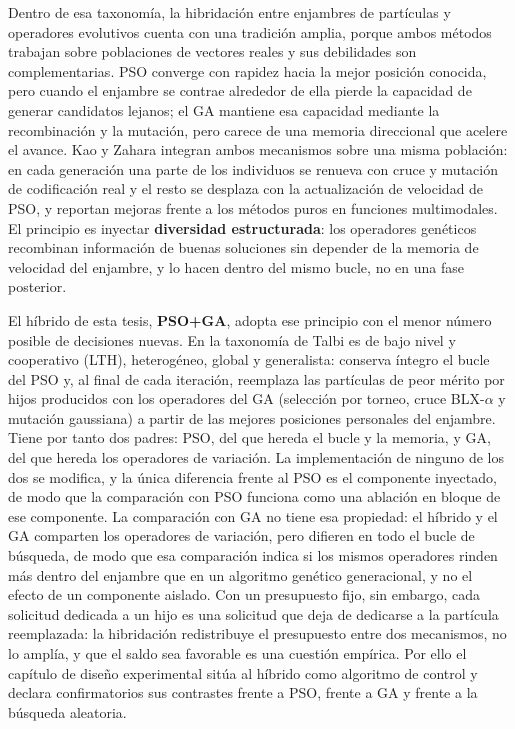 Dentro de esa taxonomía, la hibridación entre enjambres de partículas y operadores evolutivos cuenta con una tradición amplia, porque ambos métodos trabajan sobre poblaciones de vectores reales y sus debilidades son complementarias. PSO converge con rapidez hacia la mejor posición conocida, pero cuando el enjambre se contrae alrededor de ella pierde la capacidad de generar candidatos lejanos; el GA mantiene esa capacidad mediante la recombinación y la mutación, pero carece de una memoria direccional que acelere el avance. Kao y Zahara \cite{Kao2008HybridGAPSO} integran ambos mecanismos sobre una misma población: en cada generación una parte de los individuos se renueva con cruce y mutación de codificación real y el resto se desplaza con la actualización de velocidad de PSO, y reportan mejoras frente a los métodos puros en funciones multimodales. El principio es inyectar \textbf{diversidad estructurada}: los operadores genéticos recombinan información de buenas soluciones sin depender de la memoria de velocidad del enjambre, y lo hacen dentro del mismo bucle, no en una fase posterior.

El híbrido de esta tesis, \textbf{PSO+GA}, adopta ese principio con el menor número posible de decisiones nuevas. En la taxonomía de Talbi es de bajo nivel y cooperativo (LTH), heterogéneo, global y generalista: conserva íntegro el bucle del PSO y, al final de cada iteración, reemplaza las partículas de peor mérito por hijos producidos con los operadores del GA (selección por torneo, cruce BLX-$\alpha$ y mutación gaussiana) a partir de las mejores posiciones personales del enjambre. Tiene por tanto dos padres: PSO, del que hereda el bucle y la memoria, y GA, del que hereda los operadores de variación. La implementación de ninguno de los dos se modifica, y la única diferencia frente al PSO es el componente inyectado, de modo que la comparación con PSO funciona como una ablación en bloque de ese componente. La comparación con GA no tiene esa propiedad: el híbrido y el GA comparten los operadores de variación, pero difieren en todo el bucle de búsqueda, de modo que esa comparación indica si los mismos operadores rinden más dentro del enjambre que en un algoritmo genético generacional, y no el efecto de un componente aislado. Con un presupuesto fijo, sin embargo, cada solicitud dedicada a un hijo es una solicitud que deja de dedicarse a la partícula reemplazada: la hibridación redistribuye el presupuesto entre dos mecanismos, no lo amplía, y que el saldo sea favorable es una cuestión empírica. Por ello el capítulo de diseño experimental sitúa al híbrido como algoritmo de control y declara confirmatorios sus contrastes frente a PSO, frente a GA y frente a la búsqueda aleatoria.

